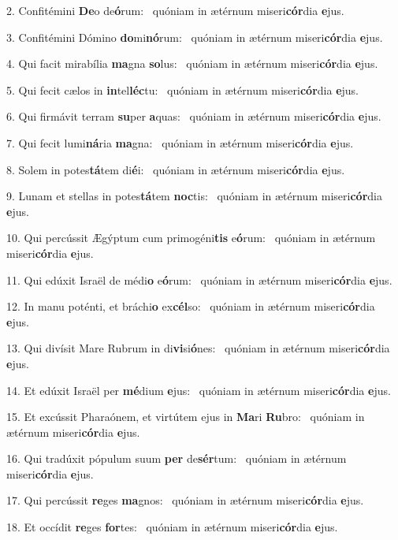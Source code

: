 2. Confitémini \textbf{De}o de\textbf{ó}rum: \ast\  quóniam in ætérnum miseri\textbf{cór}dia \textbf{e}jus.\

3. Confitémini Dómino \textbf{do}mi\textbf{nó}rum: \ast\  quóniam in ætérnum miseri\textbf{cór}dia \textbf{e}jus.\

4. Qui facit mirabília \textbf{ma}gna \textbf{so}lus: \ast\  quóniam in ætérnum miseri\textbf{cór}dia \textbf{e}jus.\

5. Qui fecit cælos in \textbf{in}tel\textbf{léc}tu: \ast\  quóniam in ætérnum miseri\textbf{cór}dia \textbf{e}jus.\

6. Qui firmávit terram \textbf{su}per \textbf{a}quas: \ast\  quóniam in ætérnum miseri\textbf{cór}dia \textbf{e}jus.\

7. Qui fecit lumi\textbf{ná}ria \textbf{ma}gna: \ast\  quóniam in ætérnum miseri\textbf{cór}dia \textbf{e}jus.\

8. Solem in potes\textbf{tá}tem di\textbf{é}i: \ast\  quóniam in ætérnum miseri\textbf{cór}dia \textbf{e}jus.\

9. Lunam et stellas in potes\textbf{tá}tem \textbf{noc}tis: \ast\  quóniam in ætérnum miseri\textbf{cór}dia \textbf{e}jus.\

10. Qui percússit Ægýptum cum primogéni\textbf{tis} e\textbf{ó}rum: \ast\  quóniam in ætérnum miseri\textbf{cór}dia \textbf{e}jus.\

11. Qui edúxit Israël de médi\textbf{o} e\textbf{ó}rum: \ast\  quóniam in ætérnum miseri\textbf{cór}dia \textbf{e}jus.\

12. In manu poténti, et bráchi\textbf{o} ex\textbf{cél}so: \ast\  quóniam in ætérnum miseri\textbf{cór}dia \textbf{e}jus.\

13. Qui divísit Mare Rubrum in di\textbf{vi}si\textbf{ó}nes: \ast\  quóniam in ætérnum miseri\textbf{cór}dia \textbf{e}jus.\

14. Et edúxit Israël per \textbf{mé}dium \textbf{e}jus: \ast\  quóniam in ætérnum miseri\textbf{cór}dia \textbf{e}jus.\

15. Et excússit Pharaónem, et virtútem ejus in \textbf{Ma}ri \textbf{Ru}bro: \ast\  quóniam in ætérnum miseri\textbf{cór}dia \textbf{e}jus.\

16. Qui tradúxit pópulum suum \textbf{per} de\textbf{sér}tum: \ast\  quóniam in ætérnum miseri\textbf{cór}dia \textbf{e}jus.\

17. Qui percússit \textbf{re}ges \textbf{ma}gnos: \ast\  quóniam in ætérnum miseri\textbf{cór}dia \textbf{e}jus.\

18. Et occídit \textbf{re}ges \textbf{for}tes: \ast\  quóniam in ætérnum miseri\textbf{cór}dia \textbf{e}jus.\

